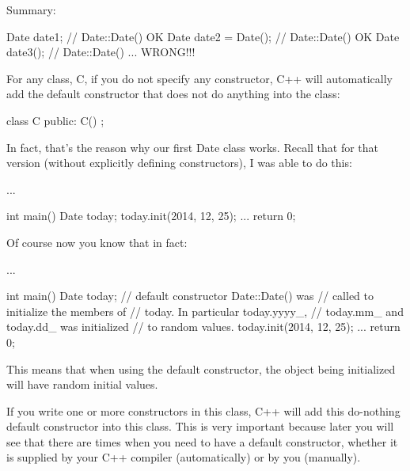Summary:

\begin{consolethree}[escapeinside=||]
Date date1;              // Date::Date() OK
Date date2 = Date(); // Date::Date() OK
Date date3();            // Date::Date() ... WRONG!!!
\end{consolethree}


\newpage{}

For any class, C, if you do not specify any constructor, C++ will
automatically add the default constructor that does not do anything into
the class:

\begin{consolethree}[escapeinside=||]
class C
{
public:
    C() {}
};
\end{consolethree}

In fact, that's the reason why our first Date class
works. Recall that for that version (without explicitly defining
constructors), I was able to do this:

\begin{consolethree}[escapeinside=||]
...

int main()
{
    Date today;
    today.init(2014, 12, 25);
    ...
    return 0;
}
\end{consolethree}

Of course now you know that in fact:

\begin{consolethree}[escapeinside=||]
...

int main()
{
    Date today; // default constructor Date::Date() was
                // called to initialize the members of
                // today. In particular today.yyyy_,
                // today.mm_ and today.dd_ was initialized
                // to random values.
    today.init(2014, 12, 25);
    ...
    return 0;
}
\end{consolethree}

This means that when using the default constructor, the object
being initialized will have random initial values.

If you write one or more constructors in this class, C++ will
 add this do-nothing default constructor into this class.
This is very important because later you will see that there are times
when you need to have a default constructor, whether it is supplied by
your C++ compiler (automatically) or by you (manually).




